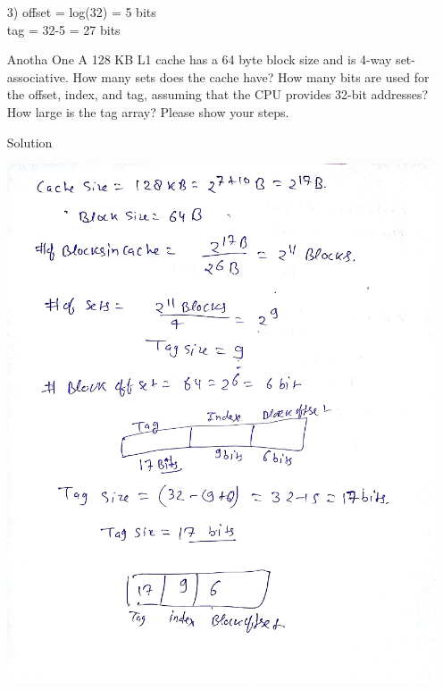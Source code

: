 \documentclass[12pt,largemargins]{article}
\begin{document}
\begin{itemize}
3) offset = log(32) = 5 bits\\
tag = 32-5 = 27 bits\\

\item[Anotha One]
A 128 KB L1 cache has a 64 byte block size and is 4-way set-associative. How many sets does the cache have? How many bits are used for the offset, index, and tag, assuming that the CPU provides 32-bit addresses? How large is the tag array? Please show your steps. \\
\item[Solution]

\includegraphics[scale=.5]{4waymapping}
\end{itemize}
\end{document}
